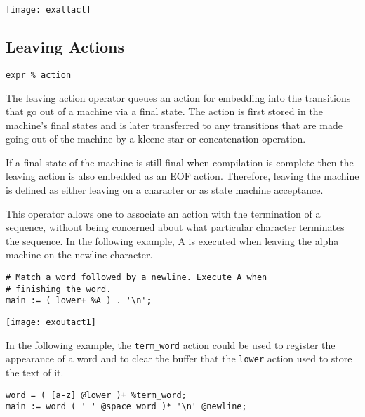 \documentclass[letterpaper,11pt,oneside]{book}
\newcommand{\verbspace}{\vspace{10pt}}
\newcommand{\graphspace}{\vspace{10pt}}
\newenvironment{inline_code}{\def\baselinestretch{1}\vspace{12pt}\small}{}
\begin{document}
\graphspace
\begin{center}
\texttt{[image: exallact]}
\end{center}
\graphspace

\subsection{Leaving Actions}
\label{out-actions}

\verb|expr % action|
\verbspace

The leaving action operator queues an action for embedding into the transitions
that go out of a machine via a final state. The action is first stored in
the machine's final states and is later transferred to any transitions that are
made going out of the machine by a kleene star or concatenation operation.

If a final state of the machine is still final when compilation is complete
then the leaving action is also embedded as an EOF action. Therefore, leaving
the machine is defined as either leaving on a character or as state machine
acceptance.

This operator allows one to associate an action with the termination of a
sequence, without being concerned about what particular character terminates
the sequence. In the following example, A is executed when leaving the alpha
machine on the newline character.

\begin{inline_code}
\begin{verbatim}
# Match a word followed by a newline. Execute A when 
# finishing the word.
main := ( lower+ %A ) . '\n';
\end{verbatim}
\end{inline_code}

\graphspace
\begin{center}
\texttt{[image: exoutact1]}
\end{center}
\graphspace

In the following example, the \verb|term_word| action could be used to register
the appearance of a word and to clear the buffer that the \verb|lower| action used
to store the text of it.

\begin{inline_code}
\begin{verbatim}
word = ( [a-z] @lower )+ %term_word;
main := word ( ' ' @space word )* '\n' @newline;
\end{verbatim}
\end{inline_code}
\end{document}
